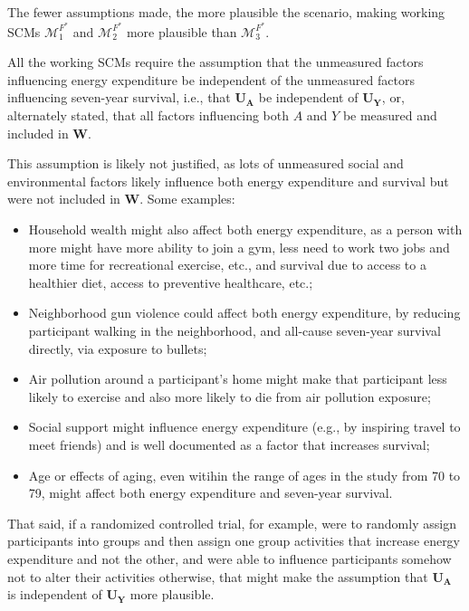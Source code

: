 \documentclass{article}\usepackage[]{graphicx}\usepackage[]{xcolor}
\begin{document}
\begin{enumerate}[label=\textbf{\arabic*.}]
\begin{enumerate}[label=\textbf{(\alph*)}]
The fewer assumptions made, the more plausible the scenario, making working SCMs $\mathcal{M}^{F^*}_1$ and $\mathcal{M}^{F^*}_2$ more plausible than $\mathcal{M}^{F^*}_3$. 

All the working SCMs require the assumption that the unmeasured factors influencing energy expenditure be independent of the unmeasured factors influencing seven-year survival, i.e., that $\bm{U_A}$ be independent of $\bm{U_Y}$, or, alternately stated, that all factors influencing both $A$ and $Y$ be measured and included in $\bm{W}$. 

This assumption is likely not justified, as lots of unmeasured social and environmental factors likely influence both energy expenditure and survival but were not included in $\bm{W}$. Some examples:

\begin{itemize}

  \item Household wealth might also affect both energy expenditure, as a person with more might have more ability to join a gym, less need to work two jobs and more time for recreational exercise, etc., and survival due to access to a healthier diet, access to preventive healthcare, etc.; 
  \item Neighborhood gun violence could affect both energy expenditure, by reducing participant walking in the neighborhood, and all-cause seven-year survival directly, via exposure to bullets;
  \item Air pollution around a participant's home might make that participant less likely to exercise and also more likely to die from air pollution exposure;
  \item Social support might influence energy expenditure (e.g., by inspiring travel to meet friends) and is well documented as a factor that increases survival;
  \item Age or effects of aging, even witihin the range of ages in the study from 70 to 79, might affect both energy expenditure and seven-year survival.

\end{itemize}

That said, if a randomized controlled trial, for example, were to randomly assign participants into groups and then assign one group activities that increase energy expenditure and not the other, and were able to influence participants somehow not to alter their activities otherwise, that might make the assumption that $\bm{U_A}$ is independent of $\bm{U_Y}$ more plausible.


\end{enumerate}
\end{enumerate}
\end{document}

